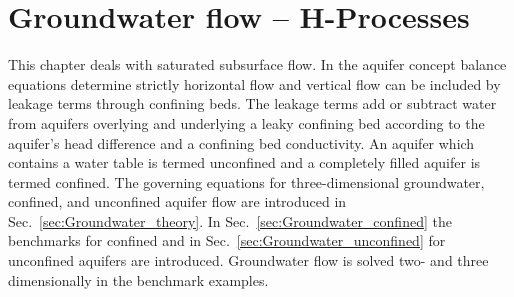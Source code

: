 \chapter{Groundwater flow -- H-Processes}
\label{sec:Groundwater}
%
This chapter deals with saturated subsurface flow. In the aquifer concept balance equations determine strictly horizontal flow and vertical flow can be included by leakage terms through confining beds. The leakage terms add or subtract water from aquifers overlying and underlying a leaky confining bed according to the aquifer's head difference and a confining bed conductivity. An aquifer which contains a water table is termed unconfined and a completely filled aquifer is termed confined. The governing equations for three-dimensional groundwater, confined, and unconfined aquifer flow are introduced in Sec.~\ref{sec:Groundwater_theory}.
In Sec.~\ref{sec:Groundwater_confined} the benchmarks for confined and in Sec.~\ref{sec:Groundwater_unconfined} for unconfined aquifers are introduced. Groundwater flow is solved two- and three dimensionally in the benchmark examples.

